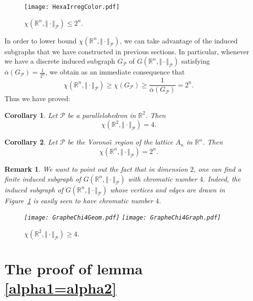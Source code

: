 \documentclass{amsart}                     %
\newtheorem{coro}{Corollary}
\newtheorem{rema}{Remark}
\newcommand{\R}{{\mathbb R}}
\newcommand{\fref}[1]{Figure~\textup{\ref{#1}}}
\begin{document}
\begin{figure}[!ht]

\texttt{[image: HexaIrregColor.pdf]}
\caption{$\chi(\R^n,\Vert \cdot \Vert_\mathcal{P})\leq 2^n $.}
\end{figure}


In order to lower bound  $\chi(\R^n,\Vert \cdot \Vert_\mathcal{P})$,  
we can take advantage of the induced subgraphs that we have constructed in previous sections.  
In particular, whenever we have a discrete induced subgraph $G_\mathcal{\mathcal{P}}$ of $G(\R^n,\Vert \cdot \Vert_\mathcal{P})$ satisfying $\bar{\alpha}(G_\mathcal{P})=\frac{1}{2^n}$, we obtain  as an immediate 
 consequence that
$$ \chi (\R^n,\Vert \cdot \Vert_\mathcal{P}) \geq \chi (G_\mathcal{P}) \geq \frac{1}{\bar{\alpha}(G_\mathcal{P})} =2^n. $$
Thus we have proved:
\begin{coro}
Let $\mathcal{P}$ be a parallelohedron in $\R^2$. Then
$$\chi (\R^2,\Vert \cdot \Vert_\mathcal{P})=4 .$$
\end{coro}

\begin{coro}
Let $\mathcal{P}$ be the Vorono\"\i\  region of the lattice $A_n$ in $\R^n$. Then
$$\chi (\R^n,\Vert \cdot \Vert_\mathcal{P})=2^n .$$
\end{coro}

\begin{rema}
We want to point out the fact that in dimension $2$, one can find a \emph{finite} induced subgraph of $G(\R^n,\Vert \cdot \Vert_\mathcal{P})$ with chromatic number $4$. Indeed,  the induced subgraph of $G(\R^n,\Vert \cdot \Vert_\mathcal{P})$ whose vertices and 
edges are drawn  in \fref{Chi} is easily seen to have chromatic number $4$.


\begin{figure}[!ht]
\texttt{[image: GrapheChi4Geom.pdf]}
\hspace{1cm}
\texttt{[image: GrapheChi4Graph.pdf]}
\caption{$\chi(\R^2,\Vert \cdot \Vert_\mathcal{P})\geq 4$.\label{Chi}}
\end{figure}
\end{rema}


\appendix

\section{The proof of lemma \ref{alpha1=alpha2}}\label{AppA}
\end{document}
